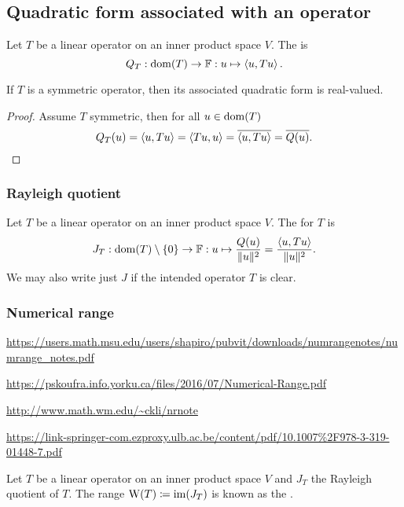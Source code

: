 \subsection{Quadratic form associated with an operator}
\begin{definition}
Let $T$ be a linear operator on an inner product space $V$. The  is
\[ Q_T: \operatorname{dom}(T)\to \mathbb{F}: u\mapsto \left\langle u,Tu \right\rangle. \]
\end{definition}
\begin{lemma} \label{lemma:symmetricRealQuadraticForm}
If $T$ is a symmetric operator, then its associated quadratic form is real-valued.
\end{lemma}
\begin{proof}
Assume $T$ symmetric, then for all $u\in\operatorname{dom}(T)$
\[ Q_T(u) = \left\langle u,Tu \right\rangle = \left\langle Tu,u \right\rangle = \overline{\left\langle u,Tu \right\rangle} = \overline{Q(u)}. \]
\end{proof}

\subsubsection{Rayleigh quotient}
\begin{definition}
Let $T$ be a linear operator on an inner product space $V$. The  for $T$ is 
\[ J_T: \operatorname{dom}(T)\setminus\{0\}\to \mathbb{F}: u\mapsto \frac{Q(u)}{\lVert u\rVert^2} = \frac{\left\langle u,Tu \right\rangle}{\lVert u\rVert^2}. \]
We may also write just $J$ if the intended operator $T$ is clear.
\end{definition}

\subsubsection{Numerical range}
\url{https://users.math.msu.edu/users/shapiro/pubvit/downloads/numrangenotes/numrange_notes.pdf}

\url{https://pskoufra.info.yorku.ca/files/2016/07/Numerical-Range.pdf}

\url{http://www.math.wm.edu/~ckli/nrnote}

\url{https://link-springer-com.ezproxy.ulb.ac.be/content/pdf/10.1007%2F978-3-319-01448-7.pdf}

\begin{definition}
Let $T$ be a linear operator on an inner product space $V$ and $J_T$ the Rayleigh quotient of $T$. The range $\operatorname{W}(T) \coloneqq \operatorname{im}(J_T)$ is known as the .
\end{definition}

